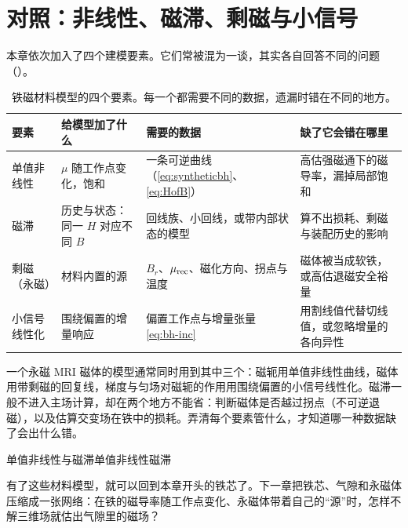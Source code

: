 \section{对照：非线性、磁滞、剩磁与小信号}\label{sec:bh-compare}

本章依次加入了四个建模要素。它们常被混为一谈，其实各自回答不同的问题（）。

\begin{table}[htbp]\centering\small
\caption{铁磁材料模型的四个要素。每一个都需要不同的数据，遗漏时错在不同的地方。}\label{tab:bh-elements}
\begin{tabularx}{\linewidth}{@{}>{\raggedright\arraybackslash}p{.15\linewidth} Y Y Y@{}}
\toprule
要素 & 给模型加了什么 & 需要的数据 & 缺了它会错在哪里\\\midrule
单值非线性 & $\mu$ 随工作点变化，饱和 & 一条可逆曲线（\eqref{eq:syntheticbh}、\eqref{eq:HofB}） & 高估强磁通下的磁导率，漏掉局部饱和\\
磁滞 & 历史与状态：同一 $H$ 对应不同 $B$ & 回线族、小回线，或带内部状态的模型 & 算不出损耗、剩磁与装配历史的影响\\
剩磁（永磁） & 材料内置的源 & $B_r$、$\mu_{\rm rec}$、磁化方向、拐点与温度 & 磁体被当成软铁，或高估退磁安全裕量\\
小信号线性化 & 围绕偏置的增量响应 & 偏置工作点与增量张量 \eqref{eq:bh-inc} & 用割线值代替切线值，或忽略增量的各向异性\\
\bottomrule
\end{tabularx}
\end{table}

一个永磁 MRI 磁体的模型通常同时用到其中三个：磁轭用单值非线性曲线，磁体用带剩磁的回复线，梯度与匀场对磁轭的作用用围绕偏置的小信号线性化。磁滞一般不进入主场计算，却在两个地方不能省：判断磁体是否越过拐点（不可逆退磁），以及估算交变场在铁中的损耗。弄清每个要素管什么，才知道哪一种数据缺了会出什么错。

\begin{compare}{单值非线性与磁滞}{单值非线性}{磁滞}
\end{compare}

有了这些材料模型，就可以回到本章开头的铁芯了。下一章把铁芯、气隙和永磁体压缩成一张网络：在铁的磁导率随工作点变化、永磁体带着自己的“源”时，怎样不解三维场就估出气隙里的磁场？

